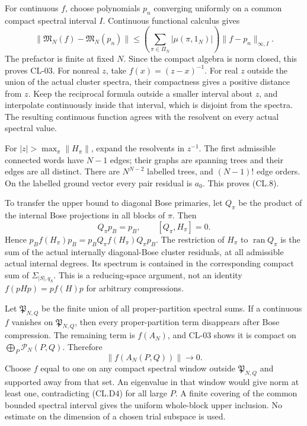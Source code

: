 For continuous \(f\), choose polynomials \(p_n\) converging uniformly on a common compact spectral interval \(I\). Continuous functional calculus gives \[
\|\mathfrak M_N(f)-\mathfrak M_N(p_n)\|
\leq\left(\sum_{\pi\in\Pi_N}|\mu(\pi,1_N)|\right)
\|f-p_n\|_{\infty,I}.
\tag{CL.D2}
\] The prefactor is finite at fixed \(N\). Since the compact algebra is norm closed, this proves CL-03. For nonreal \(z\), take \(f(x)=(z-x)^{-1}\). For real \(z\) outside the union of the actual cluster spectra, their compactness gives a positive distance from \(z\). Keep the reciprocal formula outside a smaller interval about \(z\), and interpolate continuously inside that interval, which is disjoint from the spectra. The resulting continuous function agrees with the resolvent on every actual spectral value.

For \(|z|>\max_\pi\|H_\pi\|\), expand the resolvents in \(z^{-1}\). The first admissible connected words have \(N-1\) edges; their graphs are spanning trees and their edges are all distinct. There are \(N^{N-2}\) labelled trees, and \((N-1)!\) edge orders. On the labelled ground vector every pair residual is \(a_0\). This proves (CL.8).

To transfer the upper bound to diagonal Bose primaries, let \(Q_\pi\) be the product of the internal Bose projections in all blocks of \(\pi\). Then \[
Q_\pi p_B=p_B,\qquad [Q_\pi,H_\pi]=0.
\tag{CL.D3}
\] Hence \(p_Bf(H_\pi)p_B=p_BQ_\pi f(H_\pi)Q_\pi p_B\). The restriction of \(H_\pi\) to \(\operatorname{ran}Q_\pi\) is the sum of the actual internally diagonal-Bose cluster residuals, at all admissible actual internal degrees. Its spectrum is contained in the corresponding compact sum of \(\Sigma_{|S|,q_S}\). This is a reducing-space argument, not an identity \(f(pHp)=pf(H)p\) for arbitrary compressions.

Let \(\mathfrak P_{N,Q}\) be the finite union of all proper-partition spectral sums. If a continuous \(f\) vanishes on \(\mathfrak P_{N,Q}\), then every proper-partition term disappears after Bose compression. The remaining term is \(f(A_N)\), and CL-03 shows it is compact on \(\bigoplus_P\mathcal P_N(P,Q)\). Therefore \[
\|f(A_N(P,Q))\|\longrightarrow0.
\tag{CL.D4}
\] Choose \(f\) equal to one on any compact spectral window outside \(\mathfrak P_{N,Q}\) and supported away from that set. An eigenvalue in that window would give norm at least one, contradicting (CL.D4) for all large \(P\). A finite covering of the common bounded spectral interval gives the uniform whole-block upper inclusion. No estimate on the dimension of a chosen trial subspace is used.

